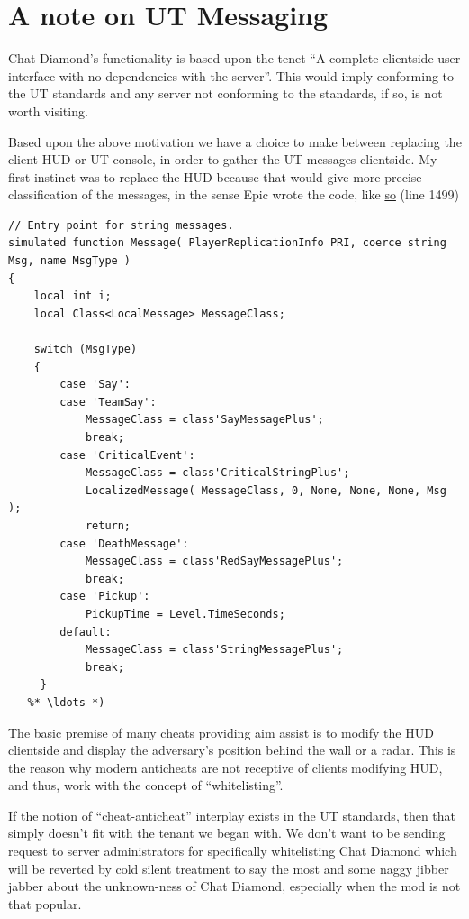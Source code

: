 \documentclass{article}
\theoremstyle{definition}
\begin{document}
\section{A note on UT Messaging}
Chat Diamond's functionality is based upon the tenet ``A complete clientside user interface with no dependencies with the server''.  This would imply conforming to the UT standards and any server not conforming to the standards, if so, is not worth visiting.

Based upon the above motivation we have a choice to make between replacing the client HUD or UT console, in order to gather the UT messages clientside.  My first instinct was to replace the HUD because that would give more precise classification of the messages, in the sense Epic wrote the code, like \href{http://uncodex.ut-files.com/UT/v436/Source_botpack/challengehud.html}{so} (line 1499)

\begin{lstlisting}[frame=single]
// Entry point for string messages.
simulated function Message( PlayerReplicationInfo PRI, coerce string Msg, name MsgType )
{
    local int i;
    local Class<LocalMessage> MessageClass;

    switch (MsgType)
    {
        case 'Say':
        case 'TeamSay':
            MessageClass = class'SayMessagePlus';
            break;
        case 'CriticalEvent':
            MessageClass = class'CriticalStringPlus';
            LocalizedMessage( MessageClass, 0, None, None, None, Msg );
            return;
        case 'DeathMessage':
            MessageClass = class'RedSayMessagePlus';
            break;
        case 'Pickup':
            PickupTime = Level.TimeSeconds;
        default:
            MessageClass = class'StringMessagePlus';
            break;
     }
   %* \ldots *)           
\end{lstlisting}

The basic premise of many cheats providing aim assist is to modify the HUD clientside and display the adversary's position behind the wall or a radar.  This is the reason why modern anticheats are not receptive of clients modifying HUD, and thus, work with the concept of ``whitelisting''.

If the notion of ``cheat-anticheat'' interplay exists in the UT standards, then that simply doesn't fit with the tenant we began with.  We don't want to be sending request to server administrators for specifically whitelisting Chat Diamond which will be reverted by cold silent treatment to say the most and some naggy jibber jabber about the unknown-ness of Chat Diamond, especially when the mod is not that popular.
\end{document}
